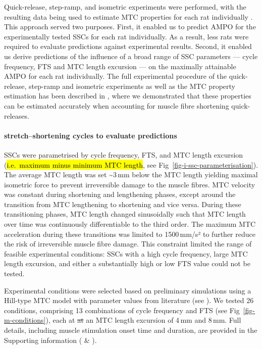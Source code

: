 \documentclass[
  10pt,
  letterpaper,
]{article}
\begin{document}
Quick-release, step-ramp, and isometric experiments were performed, with
the resulting data being used to estimate MTC properties for each rat
individually \citep[see Figure 3 of][]{reuvers_accuracy_2025}. This
approach served two purposes. First, it enabled us to predict AMPO for
the experimentally tested SSCs for each rat individually. As a result,
less rats were required to evaluate predictions against experimental
results. Second, it enabled us derive predictions of the influence of a
broad range of SSC parameters --- cycle frequency, FTS and MTC length
excursion --- on the maximally attainable AMPO for each rat
individually. The full experimental procedure of the quick-release,
step-ramp and isometric experiments as well as the MTC property
estimation has been described in {\citep{reuvers_accuracy_2025}}, where
we demonstrated that these properties can be estimated accurately when
accounting for muscle fibre shortening quick-releases.

\paragraph{stretch--shortening cycles to evaluate
predictions}\label{stretchshortening-cycles-to-evaluate-predictions}

SSCs were parametrised by cycle frequency, FTS, and MTC length excursion
(\hl{i.e.~maximum minus minimum MTC length}, see
Fig~\ref{fig-i-ssc-parameterisation}). The average MTC length was set
\textasciitilde3\,mm below the MTC length yielding maximal isometric
force to prevent irreversible damage to the muscle fibres. MTC velocity
was constant during shortening and lengthening phases, except around the
transition from MTC lengthening to shortening and vice versa. During
these transitioning phases, MTC length changed sinusoidally such that
MTC length over time was continuously differentiable to the third order.
The maximum MTC acceleration during these transitions was limited to
1500\,mm/s² to further reduce the risk of irreversible muscle fibre
damage. This constraint limited the range of feasible experimental
conditions: SSCs with a high cycle frequency, large MTC length
excursion, and either a substantially high or low FTS value could not be
tested.

Experimental conditions were selected based on preliminary simulations
using a Hill-type MTC model with parameter values from literature (see
{}). We tested 26 conditions, comprising 13
combinations of cycle frequency and FTS (see
Fig~\ref{fig-m-conditions}), each at \st{at} an MTC length excursion of
4\,mm and 8\,mm. Full details, including muscle stimulation onset time
and duration, are provided in the Supporting information
{( \& )}.
\end{document}
